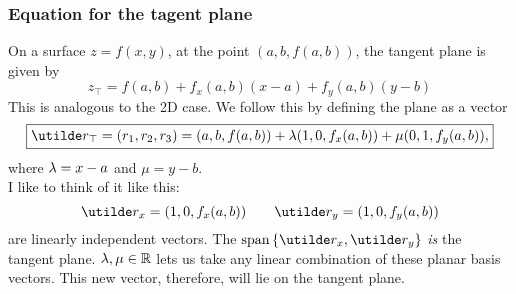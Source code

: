 \documentclass{report}
\begin{document}
\subsubsection*{Equation for the tagent plane}
On a surface $z=f(x,y)$, at the point $(a,b,f(a,b))$, the tangent plane is given by
$$
	\boxed{z_\top = f(a,b) + f_x(a,b)(x-a) + f_y(a,b)(y-b)}
$$
This is analogous to the 2D case. We follow this by defining the plane as a vector
$$
	\boxed{\ut{r}_\top = (r_1,r_2,r_3) = (a,b,f(a,b)) + \lm(1, 0, f_x(a,b)) + \mu(0, 1, f_y(a,b)),}
$$
where $\lambda=x-a$ and $\mu=y-b$.\\

\noindent I like to think of it like this:
$$
	\ut{r}_x = (1, 0, f_x(a,b))\qquad \ut{r}_y = (1, 0, f_y(a,b))
$$
are linearly independent vectors. The $\Span\braces{\ut{r}_x, \ut{r}_y}$ \textit{is} the tangent plane. $\lambda,\mu\in\mathbb{R}$ lets us take any linear combination of these planar basis vectors. This new vector, therefore, will lie on the tangent plane. 

\end{document}

